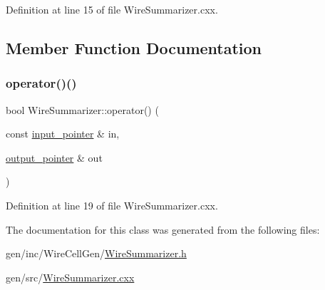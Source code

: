 Definition at line 15 of file Wire\+Summarizer.\+cxx.



\subsection{Member Function Documentation}
\mbox{\label{class_wire_cell_1_1_wire_summarizer_ac5bec6568874039cfcc6f9b5bd8ac359}} 
\subsubsection{\texorpdfstring{operator()()}{operator()()}}
{\footnotesize\ttfamily bool Wire\+Summarizer\+::operator() (\begin{DoxyParamCaption}\item[{const \hyperlink{class_wire_cell_1_1_i_function_node_a55c0946156df9b712b8ad1a0b59b2db6}{input\+\_\+pointer} \&}]{in,  }\item[{\hyperlink{class_wire_cell_1_1_i_function_node_afc02f1ec60d31aacddf64963f9ca650b}{output\+\_\+pointer} \&}]{out }\end{DoxyParamCaption})\hspace{0.3cm}{\ttfamily [virtual]}}



Definition at line 19 of file Wire\+Summarizer.\+cxx.



The documentation for this class was generated from the following files\+:\begin{DoxyCompactItemize}
\item 
gen/inc/\+Wire\+Cell\+Gen/\hyperlink{_wire_summarizer_8h}{Wire\+Summarizer.\+h}\item 
gen/src/\hyperlink{_wire_summarizer_8cxx}{Wire\+Summarizer.\+cxx}\end{DoxyCompactItemize}
